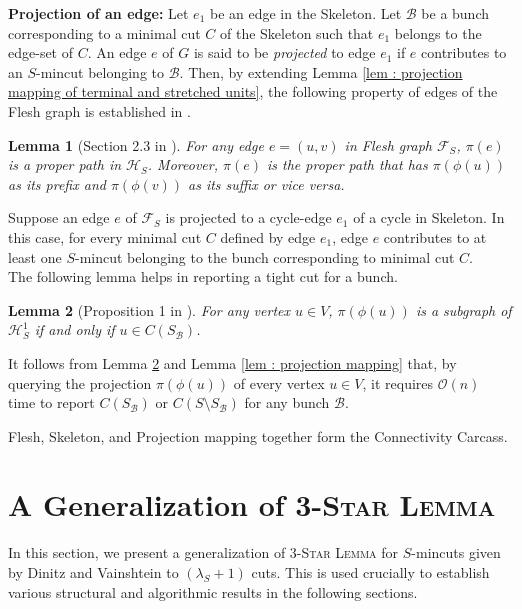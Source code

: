 \documentclass[letterpaper,11pt]{article}
\newtheorem{lemma}{Lemma}[]
\begin{document}
\noindent
\textbf{Projection of an edge:} Let $e_1$ be an edge in the Skeleton. Let ${\mathcal B}$ be a bunch corresponding to a minimal cut $C$ of the Skeleton such that $e_1$ belongs to the edge-set of $C$. An edge $e$ of $G$ is said to be \textit{projected} to edge $e_1$ if $e$ contributes to an $S$-mincut belonging to ${\mathcal B}$. Then, by extending Lemma \ref{lem : projection mapping of terminal and stretched units}, the following property of edges of the Flesh graph is established in \cite{DBLP:conf/soda/BaswanaP22}.
\begin{lemma}[Section 2.3 in \cite{DBLP:conf/soda/BaswanaP22}]  \label{lem : edge is projected to a proper path}
    For any edge $e=(u,v)$ in Flesh graph ${\mathcal F}_S$, $\pi(e)$ is a proper path in ${\mathcal H}_S$. Moreover, $\pi(e)$ is the proper path that has $\pi(\phi(u))$ as its prefix and $\pi(\phi(v))$ as its suffix or vice versa. \end{lemma}
Suppose an edge $e$ of ${\mathcal F}_S$ is projected to a cycle-edge $e_1$ of a cycle in Skeleton. In this case, for every minimal cut $C$ defined by edge $e_1$, edge $e$ contributes to at least one $S$-mincut belonging to the bunch corresponding to minimal cut $C$.\\

The following lemma helps in reporting a tight cut for a bunch. 
\begin{lemma} [Proposition 1 in  \cite{DBLP:conf/stoc/DinitzV94}] \label{lem : tight cut reporting}
    For any vertex $u\in V$, $\pi(\phi(u))$ is a subgraph of ${\mathcal H}_S^1$ if and only if $u\in C(S_{\mathcal B})$. 
\end{lemma}
It follows from Lemma \ref{lem : tight cut reporting} and Lemma \ref{lem : projection mapping} that, by querying the projection $\pi(\phi(u))$ of every vertex $u\in V$, it requires ${\mathcal O}(n)$ time to report $C(S_{\mathcal B})$ or $C(S\setminus S_{\mathcal B})$ for any bunch ${\mathcal B}$. 


\noindent
Flesh, Skeleton, and Projection mapping together form the Connectivity Carcass.

\section{A Generalization of \textsc{3-Star Lemma}} \label{sec : 3 star lemma generalized}
In this section, we present a generalization of \textsc{3-Star Lemma} for $S$-mincuts given by Dinitz and Vainshtein \cite{DBLP:conf/stoc/DinitzV94, DBLP:conf/soda/DinitzV95, DBLP:journals/siamcomp/DinitzV00} to $(\lambda_S+1)$ cuts. This is used crucially to establish various structural and algorithmic results in the following sections. 
\end{document}
